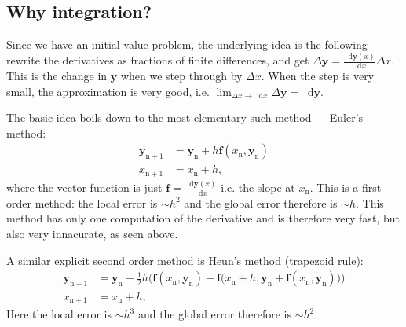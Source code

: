 \documentclass[]{article}
\newcommand{\dd}{\mathop{}\!\mathrm{d}}
\renewcommand{\vec}[1]{\boldsymbol{#1}}
\begin{document}
\subsection{Why integration?}
	Since we have an initial value problem, the underlying idea is the following --- rewrite the derivatives as fractions of finite differences, and get $\Delta \vec{y} = \frac{\dd \vec{y}(x)}{\dd x} \Delta x$. This is the change in $\vec{y}$ when we step through by $\Delta x$. When the step is very small, the approximation is very good, i.e. $\lim_{\Delta x \rightarrow \dd x} \Delta \vec{y} = \dd \vec{y}$.

	The basic idea boils down to the most elementary such method --- Euler's method:
	\begin{align}
		\vec{y}_\mathrm{n+1} &= \vec{y}_\mathrm{n} + h \vec{f}(x_\mathrm{n}, \vec{y}_\mathrm{n})\\
		x_\mathrm{n+1} &= x_\mathrm{n} + h, \nonumber
	\end{align}
	where the vector function is just $\vec{f} = \frac{\dd \vec{y}(x)}{\dd x}$ i.e. the slope at $x_\mathrm{n}$. This is a first order method: the local error is $\sim h^2$ and the global error therefore is $\sim h$. This method has only one computation of the derivative and is therefore very fast, but also very innacurate, as seen above.

	A similar explicit second order method is Heun's method (trapezoid rule):
	\begin{align}
		\vec{y}_\mathrm{n+1} &= \vec{y}_\mathrm{n} + \frac{1}{2} h \Big(\vec{f}(x_\mathrm{n}, \vec{y}_\mathrm{n}) + \vec{f}\big(x_\mathrm{n} + h, \vec{y}_\mathrm{n} + \vec{f}(x_\mathrm{n}, \vec{y}_\mathrm{n})\big)\Big)\\
		x_\mathrm{n+1} &= x_\mathrm{n} + h, \nonumber
	\end{align}
	Here the local error is $\sim h^3$ and the global error therefore is $\sim h^2$.
\end{document}
